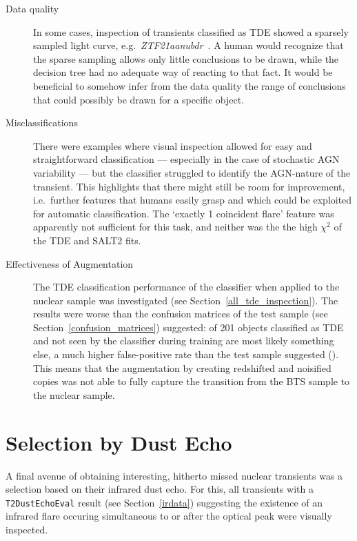 \begin{description}
  \item[Data quality] In some cases, inspection of transients classified as TDE showed a sparsely sampled light curve, e.g.~\textit{ZTF21aanubdr}~. A human would recognize that the sparse sampling allows only little conclusions to be drawn, while the decision tree had no adequate way of reacting to that fact. It would be beneficial to somehow infer from the data quality the range of conclusions that could possibly be drawn for a specific object.
  \item[Misclassifications] There were examples where visual inspection allowed for easy and straightforward classification --- especially in the case of stochastic AGN variability --- but the classifier struggled to identify the AGN-nature of the transient. This highlights that there might still be room for improvement, i.e.~further features that humans easily grasp and which could be exploited for automatic classification. The `exactly 1 coincident flare' feature was apparently not sufficient for this task, and neither was the the high $\chi^2$ of the TDE and SALT2 fits.
  \item[Effectiveness of Augmentation] The TDE classification performance of the classifier when applied to the nuclear sample was investigated (see Section~\ref{all_tde_inspection}). The results were worse than the confusion matrices of the test sample (see Section~\ref{confusion_matrices}) suggested: \xx of 201 objects classified as TDE and not seen by the classifier during training are most likely something else, a much higher false-positive rate than the test sample suggested (\xx). This means that the augmentation by creating redshifted and noisified copies was not able to fully capture the transition from the BTS sample to the nuclear sample.
\end{description}

\section{Selection by Dust Echo}\label{dustecho_sel}
A final avenue of obtaining interesting, hitherto missed nuclear transients was a selection based on their infrared dust echo. For this, all transients with a \texttt{T2DustEchoEval} result (see Section~\ref{irdata}) suggesting the existence of an infrared flare occuring simultaneous to or after the optical peak were visually inspected.

